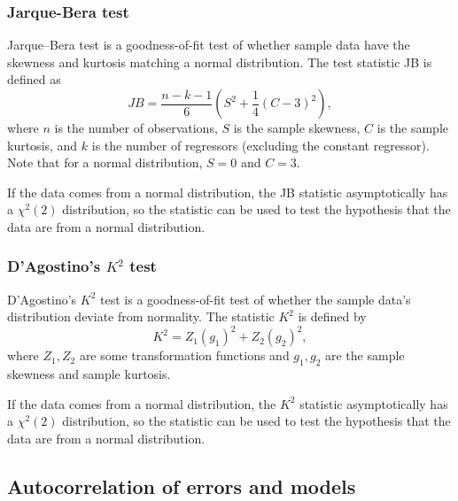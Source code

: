 \begin{refsection}
\subsubsection{Jarque-Bera test}

\begin{definition}
Jarque–Bera test is a goodness-of-fit test of whether sample data have the skewness and kurtosis matching a normal distribution. The test statistic JB is defined as
	$$JB = \frac{n-k-1}{6}(S^2 + \frac{1}{4}(C-3)^2),$$
where $n$ is the number of observations, $S$ is the sample skewness, $C$ is the sample kurtosis, and $k$ is the number of regressors (excluding the constant regressor). Note that for a normal distribution, $S = 0$ and $C = 3$. 	
\end{definition}

\begin{remark}
If the data comes from a normal distribution, the JB statistic asymptotically has a $\chi^2(2)$ distribution, so the statistic can be used to test the hypothesis that the data are from a normal distribution.
\end{remark}


\subsubsection{D'Agostino's $K^2$ test}

\begin{definition}
D'Agostino's $K^2$ test is a goodness-of-fit test of whether the sample data's distribution deviate from normality. The statistic $K^2$ is defined by
$$K^2 = Z_1(g_1)^2 + Z_2(g_2)^2,$$
where $Z_1, Z_2$ are some transformation functions and $g_1, g_2$ are the sample skewness and sample kurtosis.	
\end{definition}

\begin{remark}
	If the data comes from a normal distribution, the $K^2$ statistic asymptotically has a $\chi^2(2)$ distribution, so the statistic can be used to test the hypothesis that the data are from a normal distribution.
\end{remark}



\subsection{Autocorrelation of errors and models}


\end{refsection}

